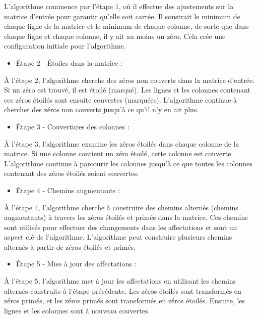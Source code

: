 \documentclass[
]{article}
\providecommand{\tightlist}{%
  \setlength{\itemsep}{0pt}\setlength{\parskip}{0pt}}
\begin{document}
L'algorithme commence par l'étape 1, où il effectue des ajustements sur
la matrice d'entrée pour garantir qu'elle soit carrée. Il soustrait le
minimum de chaque ligne de la matrice et le minimum de chaque colonne,
de sorte que dans chaque ligne et chaque colonne, il y ait au moins un
zéro. Cela crée une configuration initiale pour l'algorithme.

\begin{itemize}
\tightlist
\item
  Étape 2 - Étoiles dans la matrice :
\end{itemize}

À l'étape 2, l'algorithme cherche des zéros non couverts dans la matrice
d'entrée. Si un zéro est trouvé, il est étoilé (marqué). Les lignes et
les colonnes contenant ces zéros étoilés sont ensuite couvertes
(marquées). L'algorithme continue à chercher des zéros non couverts
jusqu'à ce qu'il n'y en ait plus.

\begin{itemize}
\tightlist
\item
  Étape 3 - Couvertures des colonnes :
\end{itemize}

À l'étape 3, l'algorithme examine les zéros étoilés dans chaque colonne
de la matrice. Si une colonne contient un zéro étoilé, cette colonne est
couverte. L'algorithme continue à parcourir les colonnes jusqu'à ce que
toutes les colonnes contenant des zéros étoilés soient couvertes.

\begin{itemize}
\tightlist
\item
  Étape 4 - Chemins augmentants :
\end{itemize}

À l'étape 4, l'algorithme cherche à construire des chemins alternés
(chemins augmentants) à travers les zéros étoilés et primés dans la
matrice. Ces chemins sont utilisés pour effectuer des changements dans
les affectations et sont un aspect clé de l'algorithme. L'algorithme
peut construire plusieurs chemins alternés à partir de zéros étoilés et
primés.

\begin{itemize}
\tightlist
\item
  Étape 5 - Mise à jour des affectations :
\end{itemize}

À l'étape 5, l'algorithme met à jour les affectations en utilisant les
chemins alternés construits à l'étape précédente. Les zéros étoilés sont
transformés en zéros primés, et les zéros primés sont transformés en
zéros étoilés. Ensuite, les lignes et les colonnes sont à nouveau
couvertes.
\end{document}

